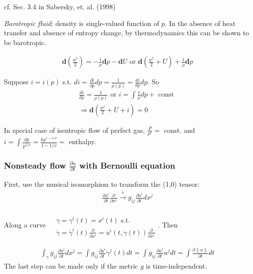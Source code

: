 \documentclass[10pt]{amsart}
\begin{document}
\begin{multicols*}{2}
cf. Sec. 3.4 in Sabersky, et. al. (1998) \cite{SAHG1998}

\emph{Barotropic fluid}: density is single-valued function of $p$. In the absence of heat transfer and absence of entropy change, by thermodynamics this can be shown to be barotropic.

\[
\begin{gathered}
\mathbf{d} \left( \frac{u^2}{2} \right) = -\frac{1}{\rho} \mathbf{d}p - \mathbf{d}U \text{ or } \mathbf{d} \left( \frac{u^2}{2} + U \right) + \frac{1}{\rho} \mathbf{d}p
\end{gathered}
\]

Suppose $i=i(p)$ s.t. $di = \frac{\partial i}{\partial p} dp = \frac{1}{\rho (p)} = \frac{di}{dp} dp$. So
\[
\begin{gathered}
\frac{di}{dp} = \frac{1}{\rho(p)} \text{ or } i = \int \frac{1}{\rho} dp + \text{ const } \\
\Longrightarrow \mathbf{d} \left( \frac{u^2}{2} + U + i \right) = 0 
\end{gathered}
\]

In special case of isentropic flow of perfect gas, $\frac{P}{\rho^{\nu}} = $ const. and $ i =\int \frac{dp}{p^{1/\nu}} = \frac{kp^{1-1/\nu}}{1- 1/\nu} = $ enthalpy.

\subsubsection{Nonsteady flow $\frac{\partial u}{\partial t}$ with Bernoulli equation}

First, use the musical isomorphism to transform the (1,0) tensor:
\[
\begin{gathered}
\frac{ \partial u^i}{\partial t}\frac{\partial}{\partial x^i} \xrightarrow{\flat} g_{ij} \frac{\partial u^i}{\partial t} dx^j
\end{gathered}
\]

Along a curve $\begin{aligned} & \quad \\ 
& \gamma = \gamma^i(t) = x^i(t) \text{ s.t. } \\
& \dot{\gamma} = \dot{\gamma}^i(t) \frac{ \partial}{\partial x^i} = u^i(t, \gamma(t)) \frac{\partial}{\partial x^i}
\end{aligned}$. Then

\[
\begin{gathered}
\int_{\gamma} g_{ij} \frac{\partial u^i}{\partial t} dx^j = \int g_{ij} \frac{\partial u^i}{\partial t} \dot{\gamma}^j(t) dt = \int g_{ij} \frac{\partial u^i}{\partial t} u^j dt = \int \frac{\partial \| u \| }{ \partial t} dt 
\end{gathered}
\]
The last step can be made only if the metric $g$ is time-independent.


\end{multicols*}
\end{document}
